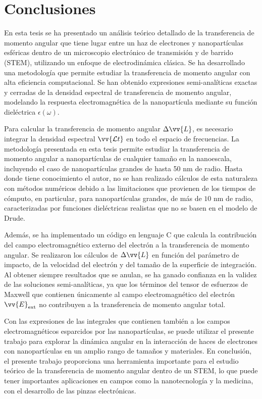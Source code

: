 
\label{conclusiones}

\section{Conclusiones}

En esta tesis se ha presentado un análisis teórico detallado de la transferencia de momento angular que tiene lugar entre un haz de electrones y nanopartículas esféricas dentro de un microscopio electrónico de transmisión y de barrido (STEM), utilizando un enfoque de electrodinámica clásica. Se ha desarrollado una metodología que permite estudiar la transferencia de momento angular con alta eficiencia computacional. Se han obtenido expresiones semi-analíticas exactas y cerradas de la densidad espectral de transferencia de momento angular, modelando la respuesta electromagnética de la nanopartícula mediante su función dieléctrica $\epsilon(\omega)$.

Para calcular la transferencia de momento angular $\Delta \vv{L}$, es necesario integrar la densidad espectral $\vv{\mathcal{L}t}$ en todo el espacio de frecuencias. La metodología presentada en esta tesis permite estudiar la transferencia de momento angular a nanopartículas de cualquier tamaño en la nanoescala, incluyendo el caso de nanopartículas grandes de hasta 50 nm de radio. Hasta donde tiene conocimiento el autor, no se han realizado cálculos de esta naturaleza con métodos numéricos debido a las limitaciones que provienen de los tiempos de cómputo, en particular, para nanopartículas grandes, de más de $10$ nm de radio, caracterizadas por funciones dieléctricas realistas que no se basen en el modelo de Drude.

Además, se ha implementado un código en lenguaje C que calcula la contribución del campo electromagnético externo del electrón a la transferencia de momento angular. Se realizaron los cálculos de $\Delta \vv{L}$ en función del parámetro de impacto, de la velocidad del electrón y del tamaño de la superficie de integración. Al obtener siempre resultados que se anulan, se ha ganado confianza en la validez de las soluciones semi-analíticas, ya que los términos del tensor de esfuerzos de Maxwell que contienen únicamente al campo electromagnético del electrón $\vv{E}_{\rm ext}$ no contribuyen a la transferencia de momento angular total. 

Con las expresiones de las integrales que contienen también a los campos electromagnéticos esparcidos por las nanopartículas, se puede utilizar el presente trabajo para explorar la dinámica angular en la interacción de haces de electrones con nanopartículas en un amplio rango de tamaños y materiales. En conclusión, el presente trabajo proporciona una herramienta importante para el estudio teórico de la transferencia de momento angular dentro de un STEM, lo que puede tener importantes aplicaciones en campos como la nanotecnología y la medicina, con  el desarrollo de las pinzas electrónicas.

